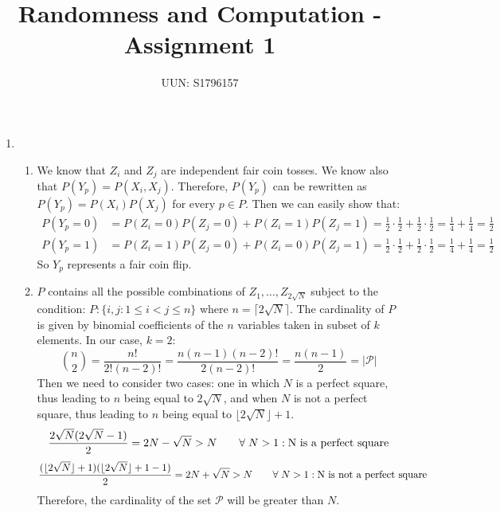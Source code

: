 \documentclass[11pt,a4paper]{article}
\author{UUN: S1796157}
\title{Randomness and Computation - Assignment 1}
\date{}
\newcommand{\floor}[1]{\lfloor #1 \rfloor}
\newcommand{\ceil}[1]{\lceil #1 \rceil}
\begin{document}
\maketitle
\begin{enumerate}
\item 
\begin{enumerate}
\item
We know that $Z_i$ and $Z_j$ are independent fair coin tosses. We know also that $P(Y_p)=P(X_i, X_j)$. Therefore, $P(Y_p)$ can be rewritten as $P(Y_p)=P(X_i)P(X_j)$ for every $p \in P$. Then we can easily show that:
\begin{align*}
P(Y_p=0) &= P(Z_i = 0)P(Z_j=0)+P(Z_i=1)P(Z_j=1) = \frac{1}{2}\cdot\frac{1}{2}+\frac{1}{2}\cdot\frac{1}{2} = \frac{1}{4}+\frac{1}{4} = \frac{1}{2}\\
P(Y_p=1) &= P(Z_i = 1)P(Z_j=0)+P(Z_i=0)P(Z_j=1) = \frac{1}{2}\cdot\frac{1}{2}+\frac{1}{2}\cdot\frac{1}{2} = \frac{1}{4}+\frac{1}{4} = \frac{1}{2}
\end{align*}
So $Y_p$ represents a fair coin flip.

\item  $P$ contains all the possible combinations of $Z_1, \ldots, Z_{2\sqrt{N}}$ subject
to the condition: $P:\{ {i,j} : 1 \leq i < j \leq n\}$	where $n=\ceil{2\sqrt{N}}$. The cardinality
of $P$ is given by binomial coefficients of the $n$ variables taken in subset of $k$ elements.
In our case, $k=2$:
\begin{equation*}
{n\choose 2} = \frac{n!}{2!(n-2)!} = \frac{n(n-1)(n-2)!}{2(n-2)!} = \frac{n(n-1)}{2} = |\mathcal{P}|
\end{equation*}
Then we need to consider two cases: one in which $N$ is a perfect square, thus leading
to $n$ being equal to $2\sqrt{N}$, and when $N$ is not a perfect square, thus
leading to $n$ being equal to $\floor{2\sqrt{N}}+1$. 
\begin{align*}
\frac{2\sqrt{N}(2\sqrt{N}-1)}{2} = 2N - \sqrt{N} > N \qquad
\forall \; {N}>1 : \hbox{N is a perfect square}
\end{align*}
\begin{align*}
\frac{(\floor{2\sqrt{N}}+1)(\floor{2\sqrt{N}}+1-1)}{2} &= 2N + \sqrt{N} > N \qquad
\forall \; {N}>1 : \hbox{N is not a perfect square}
\end{align*}
Therefore, the cardinality of the set $\mathcal{P}$ will be greater than $N$.


\end{enumerate}
\end{enumerate}
\end{document}
